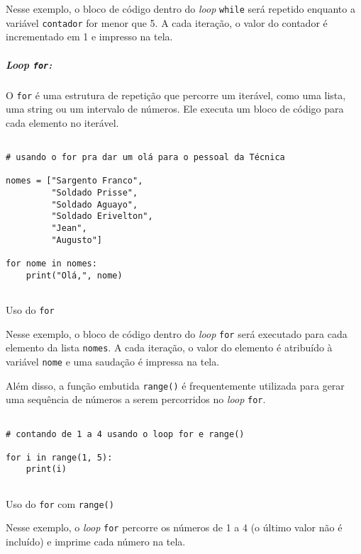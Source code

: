 \documentclass[a4paper, 12pt, onecolumn,singlespacing]{article}
\begin{document}
	Nesse exemplo, o bloco de código dentro do \textit{loop} \texttt{while} será repetido enquanto a variável \texttt{contador} for menor que 5. A cada iteração, o valor do contador é incrementado em 1 e impresso na tela.

	\subparagraph{Loop \texttt{for}: }O \texttt{for} é uma estrutura de repetição que percorre um iterável, como uma lista, uma string ou um intervalo de números. Ele executa um bloco de código para cada elemento no iterável.
\begin{listing}[!ht]
	\begin{verbatim}

# usando o for pra dar um olá para o pessoal da Técnica

nomes = ["Sargento Franco", 
         "Soldado Prisse", 
         "Soldado Aguayo",
         "Soldado Erivelton",
         "Jean",
         "Augusto"]
		 
for nome in nomes:
	print("Olá,", nome)
		
	\end{verbatim}
	\label{loop_for}
	\caption{Uso do \texttt{for}}
\end{listing}

Nesse exemplo, o bloco de código dentro do \textit{loop} \texttt{for} será executado para cada elemento da lista \texttt{nomes}. A cada iteração, o valor do elemento é atribuído à variável \texttt{nome} e uma saudação é impressa na tela.

Além disso, a função embutida \texttt{range()} é frequentemente utilizada para gerar uma sequência de números a serem percorridos no \textit{loop} \texttt{for}.

\begin{listing}[!ht]
	\begin{verbatim}
		
# contando de 1 a 4 usando o loop for e range()
		
for i in range(1, 5):
	print(i)
	
	\end{verbatim}
	\label{loop_for_range}
	\caption{Uso do \texttt{for} com \texttt{range()}}
\end{listing}

Nesse exemplo, o \textit{loop} \texttt{for} percorre os números de 1 a 4 (o último valor não é incluído) e imprime cada número na tela.
\end{document}
